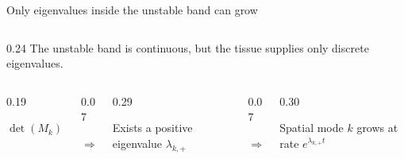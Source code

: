 \begin{frame}{Only eigenvalues inside the unstable band can grow}
\begin{columns}[c,onlytextwidth]
    \begin{column}{0.24\textwidth}
        {The unstable band is continuous, but the tissue supplies only discrete eigenvalues.}
    \end{column}
  \end{columns}

  \vspace{0.46cm}

  \begin{columns}[c,onlytextwidth]
    \begin{column}{0.19\textwidth}
      \centering
      {\color{HydraWhite}\bfseries\fontsize{10.2}{12.9}\selectfont
        $\det(M_k)<0$
      \par}
    \end{column}

    \begin{column}{0.07\textwidth}
      \centering
      {\color{HydraCyan}\fontsize{17}{17}\selectfont
        $\Rightarrow$
      \par}
    \end{column}

    \begin{column}{0.29\textwidth}
      \centering
      {\color{HydraWhite}\fontsize{8.2}{10.4}\selectfont
        Exists a positive eigenvalue $\lambda_{k,+}$ 
      \par}
    \end{column}

    \begin{column}{0.07\textwidth}
      \centering
      {\color{HydraCyan}\fontsize{17}{17}\selectfont
        $\Rightarrow$
      \par}
    \end{column}

    \begin{column}{0.30\textwidth}
      \centering
      {\color{HydraWhite}\fontsize{8.2}{10.4}\selectfont
        Spatial mode $k$ grows at rate $e^{\lambda_{k,+}t}$
      \par}
    \end{column}
  \end{columns}

\end{frame}


